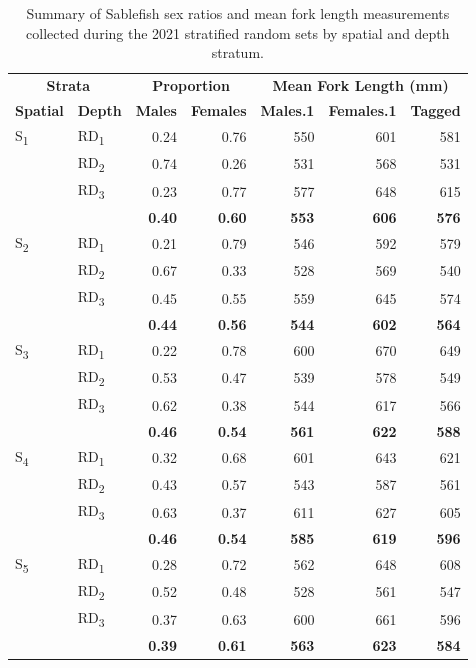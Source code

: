 \documentclass[12pt]{article}\usepackage[]{graphicx}\usepackage[]{color}
\begin{document}
\begin{table}[!h]

\caption{\label{tab:table6}Summary of Sablefish sex ratios and mean fork length measurements collected during the 2021 stratified random sets by spatial and depth stratum.}
\fontsize{9}{11}\selectfont
\begin{tabular}[t]{llrrrrr}
\toprule
\multicolumn{2}{c}{\textbf{Strata}} & \multicolumn{2}{c}{\textbf{Proportion}} & \multicolumn{3}{c}{\textbf{Mean Fork Length (mm)}} \\
\cmidrule(l{3pt}r{3pt}){1-2} \cmidrule(l{3pt}r{3pt}){3-4} \cmidrule(l{3pt}r{3pt}){5-7}
\textbf{Spatial} & \textbf{Depth} & \textbf{Males} & \textbf{Females} & \textbf{Males.1} & \textbf{Females.1} & \textbf{Tagged}\\
\midrule
S\textsubscript{1} & RD\textsubscript{1} & 0.24 & 0.76 & 550 & 601 & 581\\
 & RD\textsubscript{2} & 0.74 & 0.26 & 531 & 568 & 531\\
 & RD\textsubscript{3} & 0.23 & 0.77 & 577 & 648 & 615\\
\midrule
\textbf{} & \textbf{} & \textbf{0.40} & \textbf{0.60} & \textbf{553} & \textbf{606} & \textbf{576}\\
\midrule
S\textsubscript{2} & RD\textsubscript{1} & 0.21 & 0.79 & 546 & 592 & 579\\
 & RD\textsubscript{2} & 0.67 & 0.33 & 528 & 569 & 540\\
 & RD\textsubscript{3} & 0.45 & 0.55 & 559 & 645 & 574\\
\midrule
\textbf{} & \textbf{} & \textbf{0.44} & \textbf{0.56} & \textbf{544} & \textbf{602} & \textbf{564}\\
\midrule
S\textsubscript{3} & RD\textsubscript{1} & 0.22 & 0.78 & 600 & 670 & 649\\
 & RD\textsubscript{2} & 0.53 & 0.47 & 539 & 578 & 549\\
 & RD\textsubscript{3} & 0.62 & 0.38 & 544 & 617 & 566\\
\midrule
\textbf{} & \textbf{} & \textbf{0.46} & \textbf{0.54} & \textbf{561} & \textbf{622} & \textbf{588}\\
\midrule
S\textsubscript{4} & RD\textsubscript{1} & 0.32 & 0.68 & 601 & 643 & 621\\
 & RD\textsubscript{2} & 0.43 & 0.57 & 543 & 587 & 561\\
 & RD\textsubscript{3} & 0.63 & 0.37 & 611 & 627 & 605\\
\midrule
\textbf{} & \textbf{} & \textbf{0.46} & \textbf{0.54} & \textbf{585} & \textbf{619} & \textbf{596}\\
\midrule
S\textsubscript{5} & RD\textsubscript{1} & 0.28 & 0.72 & 562 & 648 & 608\\
 & RD\textsubscript{2} & 0.52 & 0.48 & 528 & 561 & 547\\
 & RD\textsubscript{3} & 0.37 & 0.63 & 600 & 661 & 596\\
\midrule
\textbf{} & \textbf{} & \textbf{0.39} & \textbf{0.61} & \textbf{563} & \textbf{623} & \textbf{584}\\
\bottomrule
\end{tabular}
\end{table}
\clearpage
\end{document}
